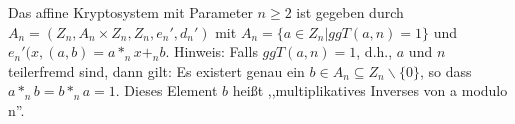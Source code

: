 \documentclass[10pt, a4paper]{exam}
\begin{document}
\begin{questions}
  Das affine Kryptosystem mit Parameter $n\geq 2$ ist gegeben durch $A_n=(Z_n,A_n\times Z_n,Z_n,e_n',d_n')$ mit $A_n=\{a\in Z_n| ggT(a, n) = 1\}$ und $e_n'(x,(a,b)=a *_n x +_n b$.
  Hinweis: Falls $ggT(a,n)=1$, d.h., $a$ und $n$ teilerfremd sind, dann gilt: Es existert genau ein $b\in A_n\subseteq Z_n\backslash\{0\}$, so dass $a*_n b=b*_n a=1$. Dieses Element $b$ heißt ,,multiplikatives Inverses von a modulo n''.

\end{questions}
\end{document}
